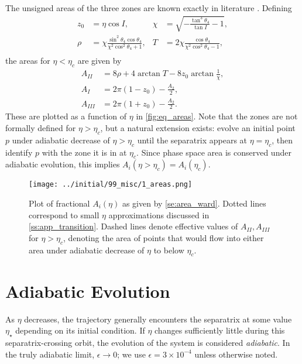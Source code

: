 \documentclass[
        fleqn,
        usenatbib,
    ]{mnras}
\newcommand*{\p}[1]{\left(#1\right)}
\begin{document}
The unsigned areas of the three zones are known exactly in literature
\citep{henrard1987,ward2004I}. Defining
\begin{align*}
    z_0 &= \eta\cos I, &
    \chi &= \sqrt{-\frac{\tan^3\theta_4}{\tan I} - 1},\\
    \rho &= \chi \frac{\sin^2 \theta_4\cos \theta_4}{
        \chi^2 \cos^2\theta_4 + 1},&
    T &= 2\chi \frac{\cos \theta_4}{
        \chi^2 \cos^2\theta_4 - 1},\\
\end{align*}
the areas for $\eta < \eta_c$ are given by
\begin{subequations}\label{se:area_ward}
    \begin{align}
        A_{II} &= 8\rho + 4\arctan T - 8z_0 \arctan \frac{1}{\chi},\\
        A_I &= 2\pi\p{1 - z_0} - \frac{A_2}{2},\\
        A_{III} &= 2\pi\p{1 + z_0} - \frac{A_2}{2}.
    \end{align}
\end{subequations}
These are plotted as a function of $\eta$ in \autoref{fig:eq_areas}. Note that
the zones are not formally defined for $\eta > \eta_c$, but a natural extension
exists: evolve an initial point $p$ under adiabatic decrease of $\eta > \eta_c$
until the separatrix appears at $\eta = \eta_c$, then identify $p$ with the zone
it is in at $\eta_c$. Since phase space area is conserved under adiabatic
evolution, this implies $A_i\p{\eta > \eta_c} = A_i(\eta_c)$.
\begin{figure}
    \centering
    \texttt{[image: ../initial/99\_misc/1\_areas.png]}
    \caption{Plot of fractional $A_{i}(\eta)$ as given by
    \autoref{se:area_ward}. Dotted lines correspond to small $\eta$
    approximations discussed in \autoref{ss:app_transition}. Dashed lines denote
    effective values of $A_{II}, A_{III}$ for $\eta > \eta_c$, denoting the
    area of points that would flow into either area under adiabatic decrease of
    $\eta$ to below $\eta_c$.}\label{fig:eq_areas}
\end{figure}

\section{Adiabatic Evolution}\label{s:ad}

As $\eta$ decreases, the trajectory generally encounters the separatrix at some
value $\eta_\star$ depending on its initial condition. If $\eta$ changes
sufficiently little during this separatrix-crossing orbit, the evolution of the
system is considered \emph{adiabatic}. In the truly adiabatic limit, $\epsilon
\to 0$; we use $\epsilon = 3 \times 10^{-4}$ unless otherwise noted.
\end{document}
